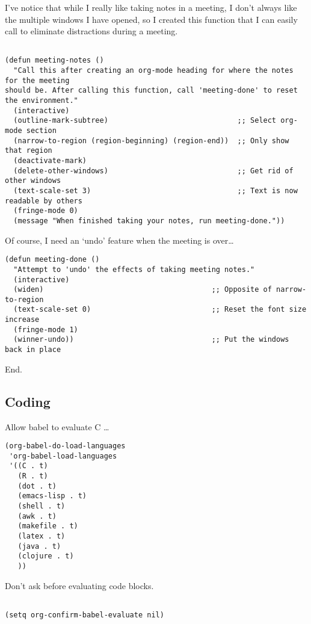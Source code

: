 \documentclass[12pt]{article}
\begin{document}
I’ve notice that while I really like taking notes in a meeting, I don’t always like the multiple windows I have opened, so I created this function that I can easily call to eliminate distractions during a meeting.
\begin{verbatim}

(defun meeting-notes ()
  "Call this after creating an org-mode heading for where the notes for the meeting
should be. After calling this function, call 'meeting-done' to reset the environment."
  (interactive)
  (outline-mark-subtree)                              ;; Select org-mode section
  (narrow-to-region (region-beginning) (region-end))  ;; Only show that region
  (deactivate-mark)
  (delete-other-windows)                              ;; Get rid of other windows
  (text-scale-set 3)                                  ;; Text is now readable by others
  (fringe-mode 0)
  (message "When finished taking your notes, run meeting-done."))

\end{verbatim}
Of course, I need an ‘undo’ feature when the meeting is over…
\begin{verbatim}
(defun meeting-done ()
  "Attempt to 'undo' the effects of taking meeting notes."
  (interactive)
  (widen)                                       ;; Opposite of narrow-to-region
  (text-scale-set 0)                            ;; Reset the font size increase
  (fringe-mode 1)
  (winner-undo))                                ;; Put the windows back in place

\end{verbatim}

End.

\subsection{Coding}
\label{sec:orge6c07f7}

Allow babel to evaluate C \ldots{}

\begin{verbatim}
(org-babel-do-load-languages
 'org-babel-load-languages
 '((C . t)
   (R . t)
   (dot . t)
   (emacs-lisp . t)
   (shell . t) 
   (awk . t)
   (makefile . t)
   (latex . t)
   (java . t)
   (clojure . t)
   ))

\end{verbatim}

Don’t ask before evaluating code blocks.
\begin{verbatim}

(setq org-confirm-babel-evaluate nil)

\end{verbatim}
\end{document}
